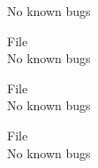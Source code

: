 \begin{DoxyRefList}
\label{bug__bug000039}%
%
No known bugs  
\item[File \doxylink{timediff_8h}{timediff.h} ]\hfill \\
\label{bug__bug000019}%
%
No known bugs  
\item[File \doxylink{TimeUpdate_8cpp}{Time\+Update.cpp} ]\hfill \\
\label{bug__bug000040}%
%
No known bugs  
\item[File \doxylink{TimeUpdate_8h}{Time\+Update.h} ]\hfill \\
\label{bug__bug000020}%
%
No known bugs 
\end{DoxyRefList}